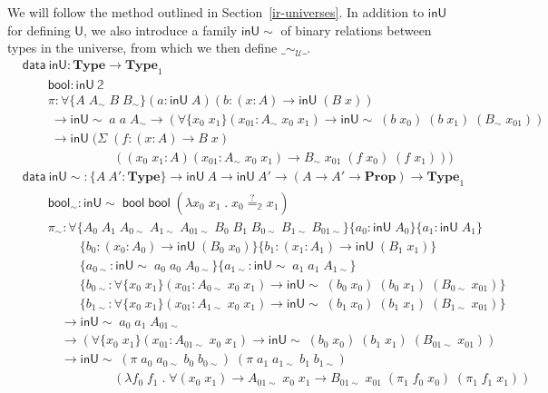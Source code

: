 \documentclass[autoref]{llncs}
\newcommand{\setoidU}{\mathcal{U}}
\newcommand{\inU}{\mathsf{inU}}
\newcommand{\inUU}{\mathsf{inU{\sim}}}
\newcommand{\mType}{\mathbf{Type}}
\newcommand{\mProp}{\mathbf{Prop}}
\newcommand{\U}{\textsf{U}}
\providecommand\mathbbm{\mathbb}
\begin{document}
We will follow the method outlined in Section~\ref{ir-universes}. In
addition to $\inU$ for defining $\U$, we also introduce a family
$\inUU$ of binary relations between types in the universe, from which we
then define $\_\sim_{\setoidU}\_$.
\vspace{-0.2em}
\begin{align*}
  & \textsf{data}\ \inU : \mType \to \mType_1 \\
  & \qquad \textsf{bool} : \inU\ \mathbbm{2} \\
  & \qquad \pi : \forall\{A\;A_\sim\;B\;B_\sim\}(a : \inU\;A)
  (b : (x : A) \to \inU\;(B\;x))\\
  & \qquad\ \to \inUU\;a\;a\;A_\sim \to (\forall\{x_0\;x_1\}(x_{01} : A_\sim\;x_0\;x_1)
  \to \inUU\;(b\;x_0)\;(b\;x_1)\;(B_\sim\;x_{01})) \\
  & \qquad\ \to \inU\;
  (\Sigma\;(f : (x : A) \to B\;x) \\
  &\qquad\qquad\qquad\quad\, ((x_0\;x_1 : A)(x_{01} : A_\sim\;x_0\;x_1) \to B_\sim\;x_{01}\;(f\;x_0)\;(f\;x_1))) \\
  & \textsf{data}\ \inUU : \{A\ A' : \mType\} \to \inU\ A \to \inU\ A' \to (A \to A' \to \mProp) \to \mType_1 \\
  & \qquad \mathsf{bool}_\sim : \inUU\;\textsf{bool}\;\textsf{bool}\;
  (\lambda x_0\;x_1\; .\; x_0 \stackrel{?}{=}_{\mathbbm{2}} x_1) \\
  & \qquad \pi_\sim :
  \forall\{A_0\;A_1\;A_{0\sim}\;A_{1\sim}\;A_{01\sim}\;B_0\;B_1\;B_{0\sim}\;B_{1\sim}\;B_{01\sim}\}
  \{ a_0 : \inU\;A_0 \}\{ a_1 : \inU\;A_1 \}\\
  & \qquad\quad\quad\ \; \{b_0 : (x_0 : A_0) \to \inU\;(B_0\;x_0)\}
  \{b_1 : (x_1 : A_1) \to \inU\;(B_1\;x_1)\}\\
  & \qquad\quad\quad\ \; \{a_{0\sim} : \inUU\;a_0\;a_0\;A_{0\sim}\}
  \{a_{1\sim} : \inUU\;a_1\;a_1\;A_{1\sim}\} \\
  & \qquad\quad\quad\ \; \{ b_{0\sim} : \forall\{x_0\;x_1\}(x_{01} : A_{0\sim}\;x_0\;x_1)
    \to \inUU\;(b_0\;x_0)\;(b_0\;x_1)\;(B_{0\sim}\;x_{01}) \}\\
  & \qquad\quad\quad\ \; \{ b_{1\sim} : \forall\{x_0\;x_1\}(x_{01} : A_{1\sim}\;x_0\;x_1)
    \to \inUU\;(b_1\;x_0)\;(b_1\;x_1)\;(B_{1\sim}\;x_{01}) \}\\
  & \qquad\quad \to \inUU\;a_0\;a_1\;A_{01\sim} \\
    & \qquad\quad \to (\forall\{x_0\;x_1\}(x_{01} : A_{01\sim}\;x_0\;x_1)
      \to \inUU\;(b_0\;x_0)\;(b_1\;x_1)\;(B_{01\sim}\;x_{01})) \\
  & \qquad\quad \to \inUU\;(\pi\;a_0\;a_{0\sim}\;b_0\;b_{0\sim})\;
      (\pi\;a_1\;a_{1\sim}\;b_1\;b_{1\sim}) \\
  & \qquad\qquad\qquad\quad\,(\lambda f_0\;f_1\;.\;\forall(x_0\;x_1)\to A_{01\sim}\;x_0\;x_1
        \to B_{01\sim}\;x_{01}\;(\pi_1\;f_0\;x_0)\;(\pi_1\;f_1\;x_1))
\end{align*}
\end{document}
